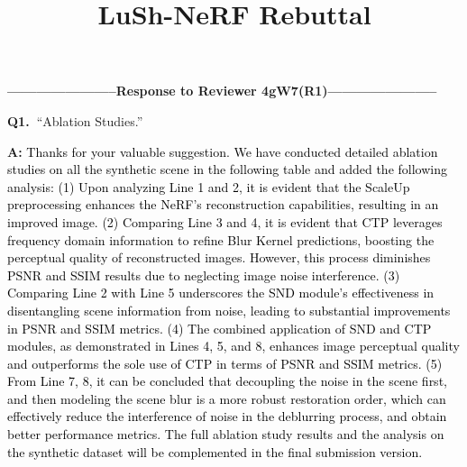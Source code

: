 \documentclass[10pt,letterpaper]{article}
\title{LuSh-NeRF Rebuttal}
\newcommand{\red}[1]{\textbf{\textcolor{myred}{#1}}}
\newcommand{\question}[3]{\noindent \textbf{{#1}.\ }{\color{black}``{#2}''}}
\newcommand{\question}[3]{\noindent \textbf{{#1}.\ }{\color{black}``{#3}''}}
\newcommand{\answer}[1]{\noindent \textbf{A:} \textcolor{black}{#1}}
\begin{document}
\maketitle

\noindent \textbf{-----------------------Response to Reviewer 4gW7(\red{R1})-----------------------}

\question{\red{Q1}}{Ablation Studies.}{The ablations would be more convincing with some quantitative results to back up the qualitative results. }

\answer{Thanks for your valuable suggestion. We have conducted detailed ablation studies on all the synthetic scene in the following table and added the following analysis:
(1) Upon analyzing Line 1 and 2, it is evident that the ScaleUp preprocessing enhances the NeRF's reconstruction capabilities, resulting in an improved image. (2) Comparing Line 3 and 4, it is evident that CTP leverages frequency domain information to refine Blur Kernel predictions, boosting the perceptual quality of reconstructed images. However, this process  diminishes PSNR and SSIM results due to neglecting image noise interference. (3) Comparing Line 2 with Line 5 underscores the SND module's effectiveness in disentangling scene information from noise, leading to substantial improvements in PSNR and SSIM metrics. (4) The combined application of SND and CTP modules, as demonstrated in Lines 4, 5, and 8, enhances image perceptual quality and outperforms the sole use of CTP in terms of PSNR and SSIM metrics. (5) From Line 7, 8, it can be concluded that decoupling the noise in the scene first, and then modeling the scene blur is a more robust restoration order, which can effectively reduce the interference of noise in the deblurring process, and obtain better performance metrics. 
The full ablation study results and the analysis on the synthetic dataset will be complemented in the final submission version.
%
}
\end{document}
